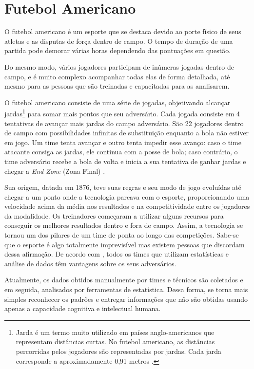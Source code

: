 \section{\textbf{{Futebol Americano}}}
\label{futebol-americano}

O futebol americano é um esporte que se destaca devido ao porte físico de seus atletas e as disputas de força dentro de campo. O tempo de duração de uma partida pode demorar várias horas dependendo das pontuações em questão.

Do mesmo modo, vários jogadores participam de inúmeras jogadas dentro de campo, e é muito complexo acompanhar todas elas de forma detalhada, até mesmo para as pessoas que são treinadas e capacitadas para as analisarem.

O futebol americano consiste de uma série de jogadas, objetivando alcançar jardas\footnote{Jarda é um termo muito utilizado em países anglo-americanos que representam distâncias curtas. No futebol americano, as distâncias percorridas pelos jogadores são representadas por jardas. Cada jarda corresponde a aproximadamente 0,91 metros \cite{BRASILESCOLA2019}.\label{Jardas}} para somar mais pontos que seu adversário. Cada jogada consiste em 4 tentativas de avançar mais jardas do campo adversário. São 22 jogadores dentro de campo com possibilidades infinitas de substituição enquanto a bola não estiver em jogo. Um time tenta avançar e outro tenta impedir esse avanço: caso o time atacante consiga as jardas, ele continua com a posse de bola; caso contrário, o time adversário recebe a bola de volta e inicia a sua tentativa de ganhar jardas e chegar a \textit{End Zone} (Zona Final) \cite{NFL2019}.

Sua origem, datada em 1876, teve suas regras e seu modo de jogo evoluídas até chegar a um ponto onde a tecnologia pareava com o esporte, proporcionando uma velocidade acima da média nos resultados e na competitividade entre os jogadores da modalidade. Os treinadores começaram a utilizar alguns recursos para conseguir os melhores resultados dentro e fora de campo. Assim, a tecnologia se tornou um dos pilares de um time de ponta ao longo das competições. Sabe-se que o esporte é algo totalmente imprevisível mas existem pessoas que discordam dessa afirmação. De acordo com , todos os times que utilizam estatísticas e análise de dados têm vantagens sobre os seus adversários.

Atualmente, os dados obtidos manualmente por times e técnicos são coletados e em seguida, analisados por ferramentas de estatística. Dessa forma, se torna mais simples reconhecer os padrões e entregar informações que não são obtidas usando apenas a capacidade cognitiva e intelectual humana.

